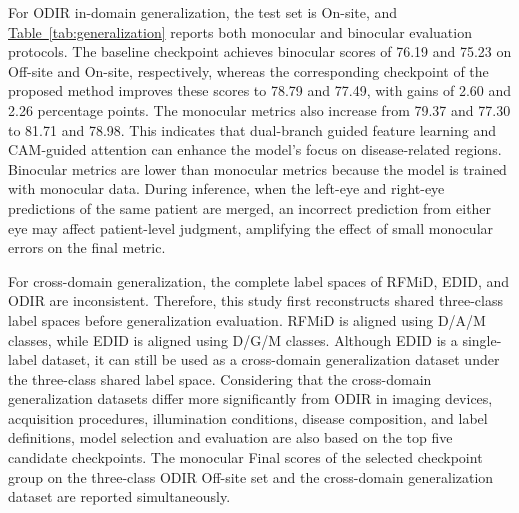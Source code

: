

For ODIR in-domain generalization, the test set is On-site, and \hyperref[tab:generalization]{Table~\ref*{tab:generalization}} reports both monocular and binocular evaluation protocols. The baseline checkpoint achieves binocular scores of 76.19 and 75.23 on Off-site and On-site, respectively, whereas the corresponding checkpoint of the proposed method improves these scores to 78.79 and 77.49, with gains of 2.60 and 2.26 percentage points. The monocular metrics also increase from 79.37 and 77.30 to 81.71 and 78.98. This indicates that dual-branch guided feature learning and CAM-guided attention can enhance the model's focus on disease-related regions. Binocular metrics are lower than monocular metrics because the model is trained with monocular data. During inference, when the left-eye and right-eye predictions of the same patient are merged, an incorrect prediction from either eye may affect patient-level judgment, amplifying the effect of small monocular errors on the final metric.

For cross-domain generalization, the complete label spaces of RFMiD, EDID, and ODIR are inconsistent. Therefore, this study first reconstructs shared three-class label spaces before generalization evaluation. RFMiD is aligned using D/A/M classes, while EDID is aligned using D/G/M classes. Although EDID is a single-label dataset, it can still be used as a cross-domain generalization dataset under the three-class shared label space. Considering that the cross-domain generalization datasets differ more significantly from ODIR in imaging devices, acquisition procedures, illumination conditions, disease composition, and label definitions, model selection and evaluation are also based on the top five candidate checkpoints. The monocular Final scores of the selected checkpoint group on the three-class ODIR Off-site set and the cross-domain generalization dataset are reported simultaneously.

